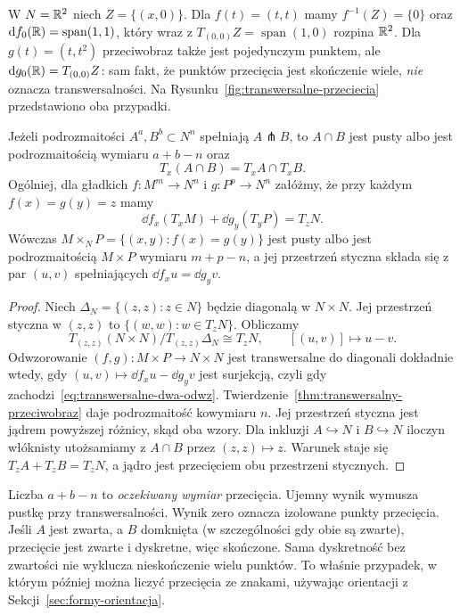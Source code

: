 \begin{przyklad}
W $N=\mathbb{R}^2$ niech $Z=\{(x,0)\}$.
Dla $f(t)=(t,t)$ mamy
$f^{-1}(Z)=\{0\}$ oraz
$\mathrm d f_0(\mathbb{R})=\operatorname{span}(1,1)$,
który wraz z $T_{(0,0)}Z=\operatorname{span}(1,0)$
rozpina $\mathbb{R}^2$. Dla $g(t)=(t,t^2)$
przeciwobraz także jest pojedynczym punktem,
ale $\mathrm d g_0(\mathbb{R})=T_{(0,0)}Z$:
sam fakt, że punktów przecięcia jest skończenie
wiele, \emph{nie} oznacza transwersalności.
Na Rysunku~\ref{fig:transwersalne-przeciecia}
przedstawiono oba przypadki.
\end{przyklad}

\begin{twierdzenie}
\label{thm:transwersalne-przeciecie}
Jeżeli podrozmaitości $A^a,B^b\subset N^n$
spełniają $A\pitchfork B$, to $A\cap B$
jest pusty albo jest podrozmaitością wymiaru $a+b-n$ oraz
\[
 T_x(A\cap B)=T_xA\cap T_xB.
\]
Ogólniej, dla gładkich $f:M^m\to N^n$ i
$g:P^p\to N^n$ załóżmy, że przy każdym
$f(x)=g(y)=z$ mamy
\begin{equation}\label{eq:transwersalne-dwa-odwz}
 \dd f_x(T_xM)+\dd g_y(T_yP)=T_zN.
\end{equation}
Wówczas
$M\times_N P=\{(x,y):f(x)=g(y)\}$
jest pusty albo jest podrozmaitością $M\times P$ wymiaru
$m+p-n$, a jej przestrzeń styczna składa się z
par $(u,v)$ spełniających $\dd f_xu=\dd g_yv$.
\end{twierdzenie}
\begin{proof}
Niech $\Delta_N=\{(z,z):z\in N\}$ będzie diagonalą
w $N\times N$. Jej przestrzeń styczna w $(z,z)$
to $\{(w,w):w\in T_zN\}$. Obliczamy
\[
 T_{(z,z)}(N\times N)/T_{(z,z)}\Delta_N
       \cong T_zN,\qquad [(u,v)]\longmapsto u-v.
\]
Odwzorowanie $(f,g):M\times P\to N\times N$
jest transwersalne do diagonali dokładnie wtedy,
gdy $(u,v)\mapsto\dd f_xu-\dd g_yv$ jest surjekcją,
czyli gdy zachodzi~\eqref{eq:transwersalne-dwa-odwz}.
Twierdzenie~\ref{thm:transwersalny-przeciwobraz}
daje podrozmaitość kowymiaru $n$.
Jej przestrzeń styczna jest jądrem powyższej
różnicy, skąd oba wzory. Dla inkluzji
$A\hookrightarrow N$ i $B\hookrightarrow N$
iloczyn włóknisty utożsamiamy z $A\cap B$
przez $(z,z)\mapsto z$. Warunek staje się
$T_zA+T_zB=T_zN$, a jądro jest przecięciem
obu przestrzeni stycznych.
\end{proof}

\begin{uwaga}
Liczba $a+b-n$ to \emph{oczekiwany wymiar}
przecięcia. Ujemny wynik wymusza pustkę przy
transwersalności. Wynik zero oznacza izolowane
punkty przecięcia. Jeśli $A$ jest zwarta, a $B$ domknięta
(w szczególności gdy obie są zwarte), przecięcie jest
zwarte i dyskretne, więc skończone. Sama dyskretność
bez zwartości nie wyklucza nieskończenie wielu punktów.
To właśnie przypadek, w którym później można
liczyć przecięcia ze znakami, używając orientacji
z Sekcji~\ref{sec:formy-orientacja}.
\end{uwaga}


